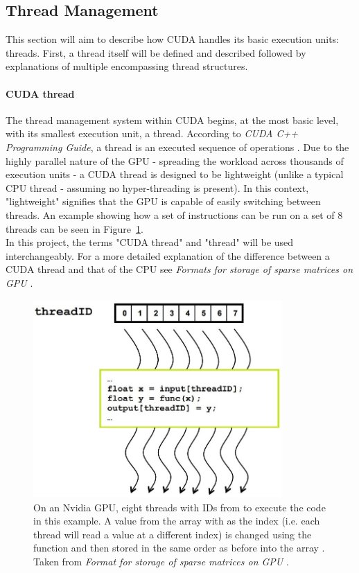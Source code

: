 \subsection{Thread Management}\label{Subsection:thread-management}
This section will aim to describe how CUDA handles its basic execution units: threads. First, a thread itself will be defined and described followed by explanations of multiple encompassing thread structures.

\paragraph{CUDA thread}
The thread management system within CUDA begins, at the most basic level, with its smallest execution unit, a thread. According to \emph{CUDA C++ Programming Guide}, a thread is an executed sequence of operations \cite{NVIDIAMay2022}. Due to the highly parallel nature of the GPU - spreading the workload across thousands of execution units - a CUDA thread is designed to be lightweight (unlike a typical CPU thread - assuming no hyper-threading is present). In this context, "lightweight" signifies that the GPU is capable of easily switching between threads. An example showing how a set of instructions can be run on a set of 8 threads can be seen in Figure~\ref{Figure:theory-CUDA-thread-parallelism}. \\
In this project, the terms "CUDA thread" and "thread" will be used interchangeably. For a more detailed explanation of the difference between a CUDA thread and that of the CPU see \emph{Formats for storage of sparse matrices on GPU} \cite{Cejka2020}.

\begin{figure}[ht!]
	\centering
	\includegraphics[width=9.5cm, keepaspectratio, clip]{images/ch1/CUDA_thread_parallelism.jpg}
	\caption{On an Nvidia GPU, eight threads with IDs from  to  execute the code in this example. A value from the array  with  as the index (i.e. each thread will read a value at a different index) is changed using the function  and then stored in the same order as before into the array . Taken from \emph{Format for storage of sparse matrices on GPU} \cite{Cejka2020, Ruetsch2008}.}
	\label{Figure:theory-CUDA-thread-parallelism}
\end{figure}

